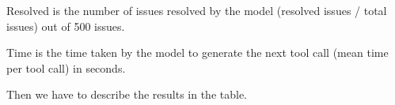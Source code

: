 Resolved is the number of issues resolved by the model (resolved issues / total issues) out of 500 issues.

Time is the time taken by the model to generate the next tool call (mean time per tool call) in seconds.

Then we have to describe the results in the table.


%
%        

